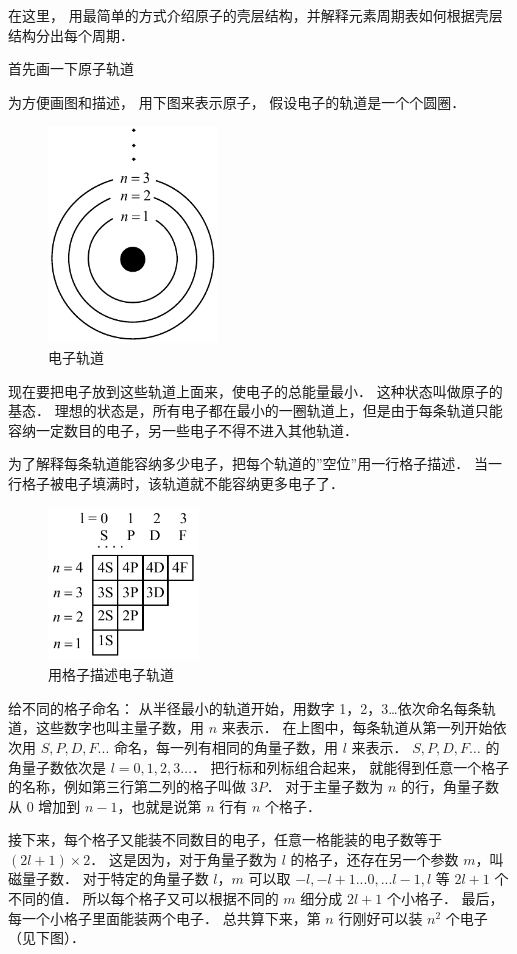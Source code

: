 在这里， 用最简单的方式介绍原子的壳层结构，并解释元素周期表如何根据壳层结构分出每个周期．

首先画一下原子轨道

为方便画图和描述， 用下图来表示原子， 假设电子的轨道是一个个圆圈．
\begin{figure}[ht]
\centering
\includegraphics[width=4.5cm]{./figures/Ptable1.pdf}
\caption{电子轨道} 
\end{figure}
现在要把电子放到这些轨道上面来，使电子的总能量最小． 这种状态叫做原子的基态． 理想的状态是，所有电子都在最小的一圈轨道上，但是由于每条轨道只能容纳一定数目的电子，另一些电子不得不进入其他轨道．

为了解释每条轨道能容纳多少电子，把每个轨道的”空位”用一行格子描述． 当一行格子被电子填满时，该轨道就不能容纳更多电子了．
\begin{figure}[ht]
\centering
\includegraphics[width=4cm]{./figures/Ptable2.pdf}
\caption{用格子描述电子轨道} 
\end{figure}
给不同的格子命名： 从半径最小的轨道开始，用数字 1，2，3…依次命名每条轨道，这些数字也叫主量子数，用 $n$ 来表示． 在上图中，每条轨道从第一列开始依次用 $S,P,D,F...$ 命名，每一列有相同的角量子数，用 $l$ 来表示．  $S,P,D,F\dots$ 的角量子数依次是 $l = 0,1,2,3\dots$． 把行标和列标组合起来， 就能得到任意一个格子的名称，例如第三行第二列的格子叫做 $3P$． 对于主量子数为 $n$ 的行，角量子数从 0 增加到 $n-1$，也就是说第 $n$ 行有 $n$ 个格子．

接下来，每个格子又能装不同数目的电子，任意一格能装的电子数等于 $(2l + 1) \times 2$． 这是因为，对于角量子数为 $l$ 的格子，还存在另一个参数 $m$，叫磁量子数． 对于特定的角量子数 $l$，$m$ 可以取 $ - l, - l + 1...0,...l - 1,l$ 等 $2l + 1$ 个不同的值． 所以每个格子又可以根据不同的 $m$ 细分成 $2l+1$ 个小格子． 最后， 每一个小格子里面能装两个电子． 总共算下来，第 $n$ 行刚好可以装 $n^2$ 个电子（见下图）．

